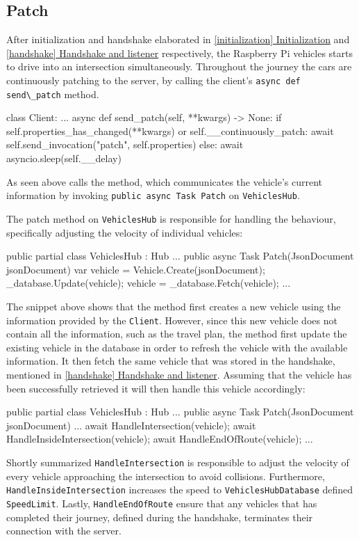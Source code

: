\subsection{Patch}
After initialization and handshake elaborated in \hyperref[initialization]{\ref{initialization} Initialization} and \hyperref[handshake]{\ref{handshake} Handshake and listener} respectively, the Raspberry Pi vehicles starts to drive into an intersection simultaneously. Throughout the journey the cars are continuously patching to the server, by calling the client's \verb|async def send\_patch| method.

\begin{python}
class Client:
	...
	async def send_patch(self, **kwargs) -> None:
		if self.properties_has_changed(**kwargs) or self.__continuously_patch:
			await self.send_invocation("patch", self.properties)
		else:
			await asyncio.sleep(self.__delay)
\end{python}

As seen above  calls the  method, which communicates the vehicle's current information by invoking \newline
\verb|public async Task Patch| on \verb|VehiclesHub|.

The patch method on \verb|VehiclesHub| is responsible for handling the behaviour, specifically adjusting the velocity of individual vehicles:
\begin{csharp}
public partial class VehiclesHub : Hub
{
	...
	public async Task Patch(JsonDocument jsonDocument)
	{
		var vehicle = Vehicle.Create(jsonDocument);
		_database.Update(vehicle);
		vehicle = _database.Fetch(vehicle);
		...
	}
}
\end{csharp}
The snippet above shows that the method first creates a new vehicle using the information provided by the \verb|Client|. However, since this new vehicle does not contain all the information, such as the travel plan, the method first update the existing vehicle in the database in order to refresh the vehicle with the available information. It then fetch the same vehicle that was stored in the handshake, mentioned in \hyperref[handshake]{\ref{handshake} Handshake and listener}. Assuming that the vehicle has been successfully retrieved it will then handle this vehicle accordingly:
\begin{csharp}
public partial class VehiclesHub : Hub
{
	...
	public async Task Patch(JsonDocument jsonDocument)
	{
		...
		await HandleIntersection(vehicle);
		await HandleInsideIntersection(vehicle);
		await HandleEndOfRoute(vehicle);
		...
	}
}
\end{csharp}
Shortly summarized \verb|HandleIntersection| is responsible to adjust the velocity of every vehicle approaching the intersection to avoid collisions. Furthermore, \verb|HandleInsideIntersection| increases the speed to \verb|VehiclesHubDatabase| defined \verb|SpeedLimit|. Lastly, \verb|HandleEndOfRoute| ensure that any vehicles that has completed their journey, defined during the handshake, terminates their connection with the server.